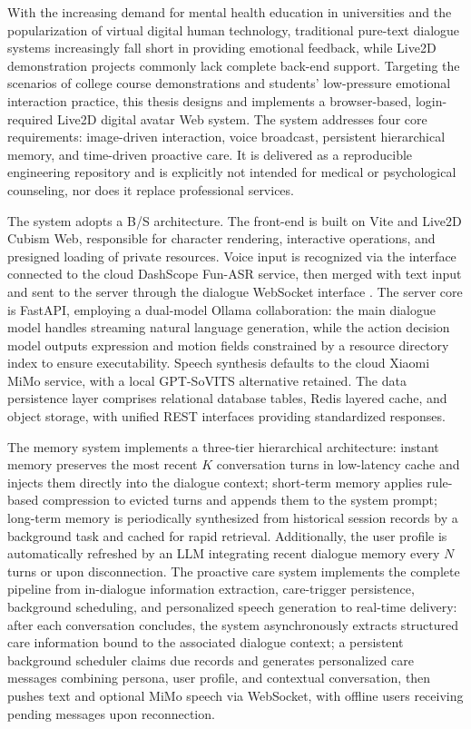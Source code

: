\documentclass{base}
\begin{document}
\begin{enabstract}
With the increasing demand for mental health education in universities and the popularization of virtual digital human technology, traditional pure-text dialogue systems increasingly fall short in providing emotional feedback, while Live2D demonstration projects commonly lack complete back-end support. Targeting the scenarios of college course demonstrations and students' low-pressure emotional interaction practice, this thesis designs and implements a browser-based, login-required Live2D digital avatar Web system. The system addresses four core requirements: image-driven interaction, voice broadcast, persistent hierarchical memory, and time-driven proactive care. It is delivered as a reproducible engineering repository and is explicitly not intended for medical or psychological counseling, nor does it replace professional services.

The system adopts a B/S architecture. The front-end is built on Vite and Live2D Cubism Web, responsible for character rendering, interactive operations, and presigned loading of private resources. Voice input is recognized via the  interface connected to the cloud DashScope Fun-ASR service, then merged with text input and sent to the server through the dialogue WebSocket interface . The server core is FastAPI, employing a dual-model Ollama collaboration: the main dialogue model handles streaming natural language generation, while the action decision model outputs expression and motion fields constrained by a resource directory index to ensure executability. Speech synthesis defaults to the cloud Xiaomi MiMo service, with a local GPT-SoVITS alternative retained. The data persistence layer comprises relational database tables, Redis layered cache, and object storage, with unified REST interfaces providing standardized responses.

The memory system implements a three-tier hierarchical architecture: instant memory preserves the most recent $K$ conversation turns in low-latency cache and injects them directly into the dialogue context; short-term memory applies rule-based compression to evicted turns and appends them to the system prompt; long-term memory is periodically synthesized from historical session records by a background task and cached for rapid retrieval. Additionally, the user profile is automatically refreshed by an LLM integrating recent dialogue memory every $N$ turns or upon disconnection. The proactive care system implements the complete pipeline from in-dialogue information extraction, care-trigger persistence, background scheduling, and personalized speech generation to real-time delivery: after each conversation concludes, the system asynchronously extracts structured care information bound to the associated dialogue context; a persistent background scheduler claims due records and generates personalized care messages combining persona, user profile, and contextual conversation, then pushes text and optional MiMo speech via WebSocket, with offline users receiving pending messages upon reconnection.


\end{enabstract}
\end{document}
